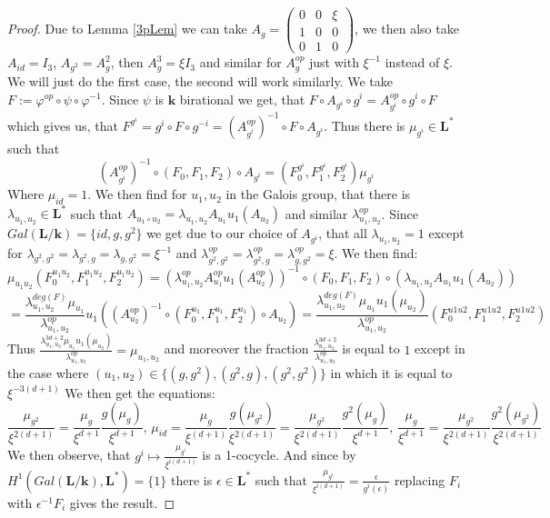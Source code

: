 \documentclass[12pt, oneside, reqno]{amsart}
\begin{document}
\begin{proof}
    Due to Lemma \ref{3pLem} we can take $A_g = 
    \begin{pmatrix} 
        0 & 0 & \xi \\
        1 & 0 & 0 \\
        0 & 1 & 0 
    \end{pmatrix}$, we then also take $A_{id} = I_3$, $A_{g^2} = A_g^2$, then $A_g^3 = \xi I_3$ and similar for $A_g^{op}$ just with $\xi^{-1}$ instead of $\xi$. We will just do the first case, the second will work similarly. We take $F := \varphi^{op} \circ \psi \circ \varphi^{-1}$. Since $\psi$ is $\textbf{k}$ birational we get, that $F \circ A_{g^i} \circ g^i = A_{g^i}^{op} \circ g^i \circ F$ which gives us, that $F^{g^i} = g^{i} \circ F \circ g^{-i} = (A_{g^{i}}^{op})^{-1} \circ F \circ A_{g^{i}}$. Thus there is $\mu_{g^{i}} \in \textbf{L}^*$ such that
    \[(A_{g^{i}}^{op})^{-1} \circ (F_0, F_1, F_2) \circ A_{g^{i}} = (F_0^{g^{i}},F_1^{g^{i}},F_2^{g^{i}})\mu_{g^{i}}\]
    Where $\mu_{id} = 1$. We then find for $u_1,u_2$ in the Galois group, that there is $\lambda_{u_1,u_2} \in \textbf{L}^*$ such that $A_{u_1 \circ u_2} = \lambda_{u_1,u_2} A_{u_1} u_1(A_{u_2})$ and similar $\lambda_{u_1,u_2}^{op}$. Since $Gal(\textbf{L}/\textbf{k}) = \{id,g,g^2 \}$ we get due to our choice of $A_{g^i}$, that all $\lambda_{u_1,u_2} = 1$ except for $\lambda_{g^2,g^2} = \lambda_{g^2,g} = \lambda_{g,g^2} = \xi^{-1}$ and $\lambda_{g^2,g^2}^{op} = \lambda_{g^2,g}^{op} =\lambda_{g,g^2}^{op} = \xi$. We then find:
    \[\mu_{u_1u_2}(F_0^{u_1u_2},F_1^{u_1u_2},F_2^{u_1u_2}) = (\lambda_{u_1,u_2}^{op} A_{u_1}^{op} u_1(A_{u_2}^{op}))^{-1} \circ (F_0,F_1,F_2) \circ (\lambda_{u_1,u_2} A_{u_1} u_1(A_{u_2})) \] 
    \[= \frac{\lambda_{u_1,u_2}^{deg(F)} \mu_{u_1}}{\lambda_{u_1,u_2}^{op}} u_1((A_{u_2}^{op})^{-1} \circ (F_0^{u_1}, F_1^{u_1}, F_2^{u_1}) \circ A_{u_2}) = \frac{\lambda_{u_1,u_2}^{deg(F)} \mu_{u_1} u_1(\mu_{u_2})}{\lambda_{u_1,u_2}^{op}} (F_0^{u1u2},F_1^{u1u2},F_2^{u1u2}) \]
    Thus $\frac{\lambda_{u_1,u_2}^{3d + 2} \mu_{u_1} u_1(\mu_{u_2})}{\lambda_{u_1,u_2}^{op}} = \mu_{u_1,u_2}$ and moreover the fraction $\frac{\lambda_{u_1,u_2}^{3d + 2}}{\lambda_{u_1,u_2}^{op}}$ is equal to $1$ except in the case where $(u_1,u_2) \in \{ (g,g^2), (g^2,g),(g^2,g^2) \}$ in which it is equal to $\xi^{-3(d+1)}$ We then get the equations:
    \[\frac{\mu_{g^2}}{\xi^{2(d+1)}} = \frac{\mu_g}{\xi^{d+1}} \frac{g(\mu_g)}{\xi^{d+1}}, \, \mu_{id} = \frac{\mu_g}{\xi^{(d+1)}} \frac{g(\mu_{g^2})}{\xi^{2(d+1)}} = \frac{\mu_{g^2}}{\xi^{2(d+1)}} \frac{g^2(\mu_g)}{\xi^{d+1}}, \, \frac{\mu_g}{\xi^{d+1}} = \frac{\mu_{g^2}}{\xi^{2(d+1)}}\frac{g^2(\mu_{g^2})}{\xi^{2(d+1)}}\]
    We then observe, that $g^{i} \mapsto \frac{\mu_{g^i}}{\xi^{i(d+1)}}$ is a 1-cocycle. And since by \cite{serre2004corps} $H^1(Gal(\textbf{L}/\textbf{k}),\textbf{L}^*) = \{ 1 \}$ there is $\epsilon \in \textbf{L}^*$ such that $\frac{\mu_{g^{i}}}{ \xi^{i(d+1)}} = \frac{\epsilon}{g^{i}(\epsilon)}$ replacing $F_i$ with $\epsilon^{-1} F_i$ gives the result.
\end{proof}
\end{document}
